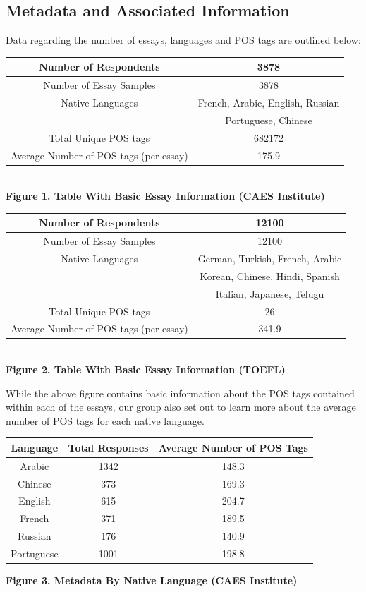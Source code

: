 \documentclass[11pt,a4paper]{article}
\newcommand\tab[1][1cm]{\hspace*{#1}}
\begin{document}
\subsection{Metadata and Associated Information}
\tab Data regarding the number of essays, languages and POS tags are outlined below:
\begin{center}
	\begin{tabular}{|c|c|}
		\hline
		Number of Respondents & 3878\\
		\hline
		Number of Essay Samples & 3878\\
		\hline
		Native Languages & French, Arabic,
		English, Russian\\
		& Portuguese, Chinese\\
		\hline
		Total Unique POS tags & 682172\\
		\hline
		Average Number of POS tags (per essay) & 175.9\\
		\hline
	\end{tabular}\\
	\textbf{Figure 1. Table With Basic Essay Information (CAES Institute)}
	
	\begin{center}
		\begin{tabular}{|c|c|}
			\hline
			Number of Respondents & 12100\\
			\hline
			Number of Essay Samples & 12100\\
			\hline
			Native Languages & German, Turkish, French, Arabic\\
			& Korean, Chinese, Hindi, Spanish \\
			& Italian, Japanese, Telugu\\
			\hline
			Total Unique POS tags & 26\\
			\hline
			Average Number of POS tags (per essay) & 341.9\\
			\hline
		\end{tabular}\\
		\textbf{Figure 2. Table With Basic Essay Information (TOEFL)}
	\end{center}
\end{center}
While the above figure contains basic information about the POS tags contained within each of the essays, our group also set out to learn more about the average number of POS tags for each native language. 
\begin{center}
	\begin{tabular}{|c|c|c|}
		\hline
		\textbf{Language} & \textbf{Total Responses} & \textbf{Average Number of POS Tags}\\
		\hline
		Arabic & 1342 & 148.3\\
		\hline
		Chinese & 373 & 169.3\\
		\hline
		English & 615 & 204.7\\
		\hline
		French & 371 & 189.5\\
		\hline
		Russian & 176 & 140.9\\
		\hline
		Portuguese & 1001 & 198.8\\
		\hline
	\end{tabular}
	\textbf{Figure 3. Metadata By Native Language (CAES Institute)}
\end{center}
\end{document}
